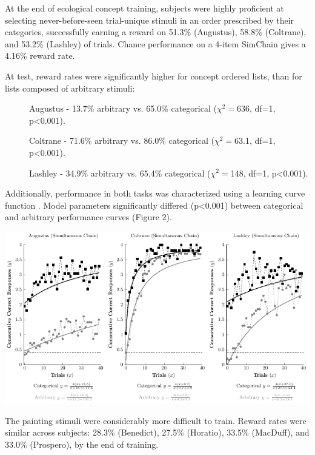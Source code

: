 \documentclass[a0,portrait]{a0poster}
\begin{document}
\begin{multicols}{2}
At the end of ecological concept training, subjects were highly proficient at selecting never-before-seen trial-unique stimuli in an order prescribed by their categories, successfully earning a reward on 51.3\% (Augustus), 58.8\% (Coltrane), and 53.2\% (Lashley) of trials. Chance performance on a 4-item SimChain gives a 4.16\% reward rate.\vspace{0.1cm}

At test, reward rates were significantly higher for concept ordered lists, than for lists composed of arbitrary stimuli:
{\small
\begin{description}
\item[] Augustus - 13.7\% arbitrary vs. 65.0\% categorical ($\chi^2=$636, df=1, p\textless 0.001).
\item[] Coltrane - 71.6\% arbitrary vs. 86.0\% categorical ($\chi^2=$63.1, df=1, p\textless 0.001). 
\item[] Lashley - 34.9\% arbitrary vs. 65.4\% categorical ($\chi^2=$148, df=1, p\textless 0.001).
\end{description}
}

Additionally, performance in both tasks was characterized using a learning curve function \cite{thurstone1919}. Model parameters significantly differed (p\textless 0.001) between categorical and arbitrary performance curves (Figure 2).

\begin{center}\vspace{1cm}
\includegraphics[width=0.8\linewidth]{Figure-02.pdf}
\end{center}\vspace{1cm}

The painting stimuli were considerably more difficult to train. Reward rates were similar across subjects: 28.3\% (Benedict), 27.5\% (Horatio), 33.5\% (MacDuff), and 33.0\% (Prospero), by the end of training.\vspace{0.1cm}


\end{multicols}
\end{document}
